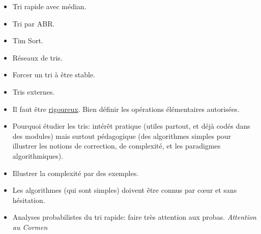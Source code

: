 \documentclass{agregfiche}
\begin{document}
\secidees

\begin{itemize}
    \item Tri rapide avec médian.
    \item Tri par ABR.
    \item Tim Sort.
    \item Réseaux de tris.
    \item Forcer un tri à être stable.
    \item Tris externes.
\end{itemize}

\secpieges

\begin{itemize}
    \item Il faut être \underline{rigoureux}. Bien définir les opérations élémentaires autorisées.
    \item Pourquoi étudier les tris: intérêt pratique (utiles partout, et déjà codés dans des modules) mais surtout pédagogique (des algorithmes simples pour illustrer les notions de correction, de complexité, et les paradigmes algorithmiques).
    \item Illustrer la complexité par des exemples.
    \item Les algorithmes (qui sont simples) doivent être connus par c\oe ur et sans hésitation.
    \item Analyses probabilistes du tri rapide: faire très attention aux probas.
        \emph{Attention au Cormen}
\end{itemize}


\secquestionsclassiques
\end{document}
